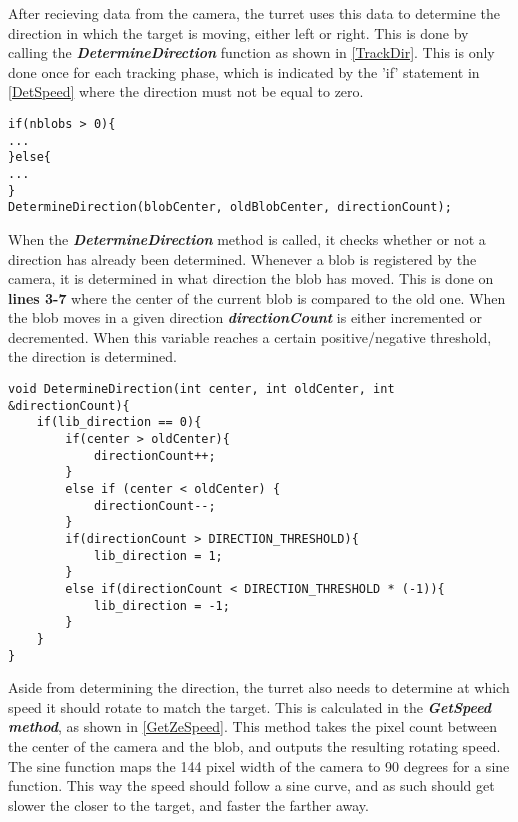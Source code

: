 After recieving data from the camera, the turret uses this data to determine the
direction in which the target is moving, either left or right. This is done by
calling the \textbf{\textit{DetermineDirection}} function as shown in
\autoref{TrackDir}. This is only done once for each tracking phase, which is
indicated by the 'if' statement in \autoref{DetSpeed} where the direction
must not be equal to zero.

\begin{minipage}[H]{\linewidth}
\begin{lstlisting}[caption = Call DetermineDirection., label = TrackDir]
if(nblobs > 0){
...
}else{
...
}
DetermineDirection(blobCenter, oldBlobCenter, directionCount);
\end{lstlisting}
\end{minipage}

When the \textbf{\textit{DetermineDirection}} method is called, it checks
whether or not a direction has already been determined. Whenever a blob is
registered by the camera, it is determined in what direction the blob has
moved. This is done on \textbf{lines 3-7} where the center of the
current blob is compared to the old one. When the blob moves in a given
direction \textbf{\textit{directionCount}} is either incremented or decremented.
When this variable reaches a certain positive/negative threshold, the direction
is determined.

\begin{minipage}[H]{\linewidth}
\begin{lstlisting}[caption = Determine the targets direction., label = DeterDir]
void DetermineDirection(int center, int oldCenter, int &directionCount){
	if(lib_direction == 0){
		if(center > oldCenter){
    		directionCount++;
		}
    	else if (center < oldCenter) {
    		directionCount--;
   		}
    	if(directionCount > DIRECTION_THRESHOLD){
    		lib_direction = 1;
    	}
    	else if(directionCount < DIRECTION_THRESHOLD * (-1)){
    		lib_direction = -1;
    	}
    }
}
\end{lstlisting}
\end{minipage}

Aside from determining the direction, the turret also needs to determine at
which speed it should rotate to match the target. This is calculated in the
\textbf{\textit{GetSpeed method}}, as shown in \autoref{GetZeSpeed}. This method
takes the pixel count between the center of the camera and the blob, and outputs
the resulting rotating speed. The sine function maps the 144 pixel width of the
camera to 90 degrees for a sine function. This way the speed should follow a
sine curve, and as such should get slower the closer to the target, and faster
the farther away.

